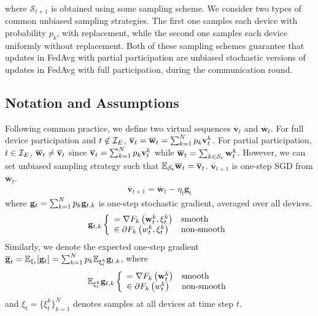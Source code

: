 where $\mathcal{S}_{t+1}$ is obtained using some sampling scheme. We consider two types of common unbiased sampling strategies. The first one samples each device with probability $p_k$, with replacement, while the second one samples each device uniformly without replacement. Both of these sampling schemes guarantee that updates in FedAvg with partial participation are unbiased stochastic versions of updates in FedAvg with full participation, during the communication round.

\subsection{Notation and Assumptions}

Following common practice, we define two virtual sequences $\overline{\mathbf{v}}_{t}$ and $\overline{\mathbf{w}}_{t}$. For full device participation and $t \notin {\mathcal{I}}_E$,
${\overline{\mathbf{v}}}_t = {\overline{\mathbf{w}}}_t =\sum_{k=1}^{N} p_{k} \mathbf{v}_{t}^{k}$. For partial participation, $t \in {\mathcal{I}}_E$, ${\overline{\mathbf{w}}}_t \neq {\overline{\mathbf{v}}}_t$ since ${\overline{\mathbf{v}}}_t=\sum_{k=1}^{N} p_{k} \mathbf{v}_{t}^{k}$ while ${\overline{\mathbf{w}}}_t=\sum_{k\in {\mathcal{S}}_t}\mathbf{w}_{t}^{k}$. However, we can
set unbiased sampling strategy such that $ \mathbb{E}_{{\mathcal{S}}_t} {\overline{\mathbf{w}}}_t = {\overline{\mathbf{v}}}_t$.
$\overline{\mathbf{v}}_{t+1}$ is one-step SGD from $\overline{\mathbf{w}}_{t}$. 
\begin{align}
\overline{\mathbf{v}}_{t+1}=\overline{\mathbf{w}}_{t}-\eta_{t} \mathbf{g}_{t}	\label{eq:vbar}
\end{align}
where ${\mathbf{g}}_{t} = \sum_{k=1}^{N} p_{k} {\mathbf{g}}_{t,k} $ is one-step stochastic gradient, averaged over all devices. 
\begin{align}
{\mathbf{g}}_{t,k} \left\{\begin{array}{ll} 
 = \nabla F_{k}\left(\mathbf{w}_{t}^{k},\xi_{t}^{k} \right)  &  \text{smooth}\\
 \in \partial F_{k}\left(w_{t}^{k}, \xi_{t}^{k}\right)  & \text{non-smooth}
 \end{array}\right.
\end{align}
Similarly, we denote the expected one-step gradient ${\overline{\mathbf{g}}}_{t}= \mathbb{E}_{\xi_t}[{\mathbf{g}}_t] = \sum_{k=1}^{N} p_{k} \mathbb{E}_{\xi_{t}^{k}} {\mathbf{g}}_{t,k}$, where
\begin{align}
\mathbb{E}_{\xi_{t}^{k}} {\mathbf{g}}_{t,k}  \left\{\begin{array}{ll} 
 = \nabla F_{k}\left(\mathbf{w}_{t}^{k}\right)  &  \text{smooth}\\
 \in \partial F_{k}\left(w_{t}^{k}\right)  & \text{non-smooth}
 \end{array}\right.
\end{align}
and $\xi_t = \{\xi_t^k\}_{k=1}^N$ denotes samples at all devices at time step $t$. 

